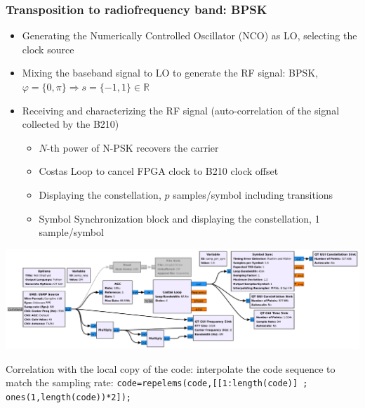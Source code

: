 \documentclass[compress,10pt,aspectratio=169]{beamer}
\begin{document}
\begin{frame}\frametitle{Transposition to radiofrequency band: BPSK}

\parbox{1.05\linewidth}{
\begin{itemize}
\item Generating the Numerically Controlled Oscillator (NCO) as LO, selecting the clock source
\vspace{-0.1cm}
\item Mixing the baseband signal to LO to generate the RF signal: BPSK, $\varphi=\{0,\pi\}\Rightarrow
s=\{-1,1\}\in\mathbb{R}$
\item Receiving and characterizing the RF signal (auto-correlation of the signal collected by the B210)
\begin{itemize}
\item $N$-th power of N-PSK recovers the carrier
\item Costas Loop to cancel FPGA clock to B210 clock offset
\item Displaying the constellation, $p$ samples/symbol including transitions
\item Symbol Synchronization block and displaying the constellation, 1 sample/symbol
\end{itemize}
\end{itemize}
}

\vspace{-0.15cm}
\includegraphics[width=\linewidth]{b210.pdf} %

\vspace{-0.15cm}
Correlation with the local copy of the code: interpolate the code sequence to match the sampling rate:
\verb~code=repelems(code,[[1:length(code)] ; ones(1,length(code))*2]);~
\end{frame}
\end{document}
